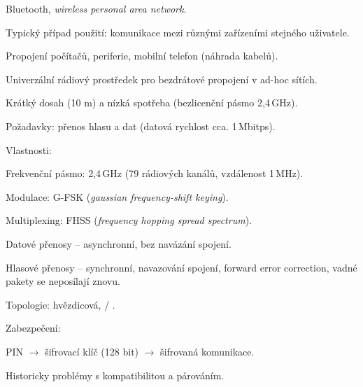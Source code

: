 \begin{compactitem}
    \item Bluetooth, \textit{wireless personal area network}.

    \item Typický případ použití: komunikace mezi různými zařízeními stejného uživatele. \begin{compactitem}
        \item Propojení počítačů, periferie, mobilní telefon (náhrada kabelů).
    \end{compactitem}

    \item Univerzální rádiový prostředek pro bezdrátové propojení v ad-hoc sítích.

    \item Krátký dosah (10 m) a nízká spotřeba (bezlicenční pásmo 2,4\,GHz).

    \item Požadavky: přenos hlasu a dat (datová rychlost cca. 1\,Mbitps).

    \item Vlastnosti: \begin{compactitem}
        \item Frekvenční pásmo: 2,4\,GHz (79 rádiových kanálů, vzdálenost 1\,MHz).
        \item Modulace: G-FSK (\textit{gaussian frequency-shift keying}).
        \item Multiplexing: FHSS (\textit{frequency hopping spread spectrum}).
        \item Datové přenosy -- asynchronní, bez navázání spojení.
        \item Hlasové přenosy -- synchronní, navazování spojení, forward error correction, vadné pakety se neposílají znovu.
    \end{compactitem}

    \item Topologie: hvězdicová,  / .

    \item Zabezpečení: \begin{compactitem}
        \item PIN $\rightarrow$ šifrovací klíč (128 bit) $\rightarrow$ šifrovaná komunikace.
    \end{compactitem}

    \item Historicky problémy s kompatibilitou a párováním.
\end{compactitem}

